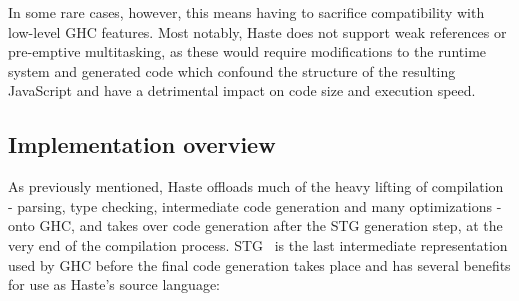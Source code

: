 \documentclass[preprint]{sigplanconf}
\begin{document}
In some rare cases, however, this means having to sacrifice compatibility with
low-level GHC features. Most notably, Haste does not support weak references
or pre-emptive multitasking, as these would require modifications to the
runtime system and generated code which confound the structure of the
resulting JavaScript and have a detrimental impact on code size and execution
speed.

\subsection{Implementation overview}

As previously mentioned, Haste offloads much of the heavy lifting of
compilation - parsing, type checking, intermediate code generation and many
optimizations - onto GHC, and takes over code generation after the STG
generation step, at the very end of the compilation process. STG\ \cite{stg} is
the last intermediate representation used by GHC before the final code
generation takes place and has several benefits for use as Haste's source
language:
\end{document}
